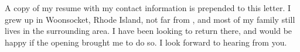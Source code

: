 A copy of my resume with my contact information is prepended to this letter. I grew up in Woonsocket, Rhode Island, not far from \city{}, and most of my family still lives in the surrounding area. I have been looking to return there, and would be happy if the \position{} opening brought me to do so. I look forward to hearing from you.
